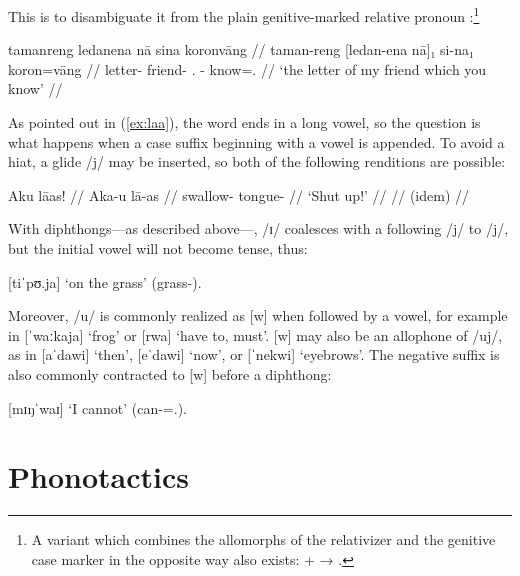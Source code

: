 \noindent This is to disambiguate it from the plain genitive-marked relative 
pronoun :\footnote{A variant which combines the 
allomorphs of the relativizer and the genitive case marker in the opposite way 
also exists:  +  → .}

\ex\begingl
	\gla tamanreng ledanena nā sina koronvāng //
	\glb taman-reng [ledan-ena nā]₁ si-na₁ koron=vāng //
	\glc letter-\AargI{} friend-\Gen{} \Fsg.\Gen{} \Rel{}-\Gen{} 
		know=\Ssg{}.\Aarg{} //
	\glft `the letter of my friend which you know' //
\endgl\xe

As pointed out in (\ref{ex:laa}), the word  ends in a 
long vowel, so the question is what happens when a case suffix beginning with a 
vowel is appended. To avoid a hiat, a glide /j/ may be inserted, so both of 
the following renditions are possible:

\pex
	\a\begingl
		\gla Aku lāas! //
		\glb Aka-u lā-as //
		\glc swallow-\Imp{} tongue-\Parg{} //
		\glft `Shut up!' //
	\endgl
	\a\begingl
		 //
		\glft (idem) //
	\endgl
\xe

\noindent With diphthongs---as described above---, /ɪ/ coalesces with a 
following /j/ to /j/, but the initial vowel will not become tense, thus:

\ex
	 [tiˈpʊ.ja] `on the grass' 
		(grass-\Loc{}).
\xe

Moreover, /u/ is commonly realized as [w] when followed by a vowel, for example 
in  [ˈwaːkaja] `frog' or  [rwa] `have 
to, must'. [w] may also be an allophone of /uj/, as in  
[aˈdawi] `then',  [eˈdawi] `now', or  
[ˈnekwi] `eyebrows'. The negative suffix  is also commonly 
contracted to [w] before a diphthong:

\ex
	 [mɪŋˈwaɪ] 
		`I cannot' (can-\Neg{}=\Fsg{}.\Top{}).
\xe

%
%

\section{Phonotactics}
\label{sec:phonotactics}

